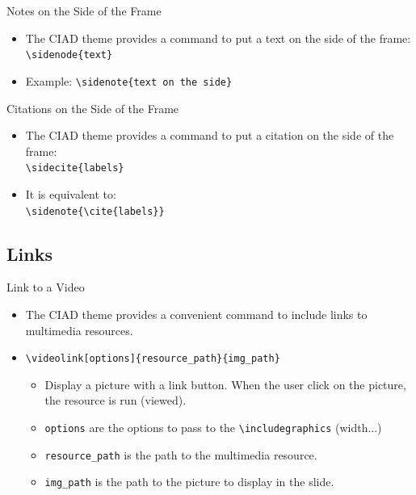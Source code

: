 \documentclass[english,sectioncirclenumberstyle]{ciadbeamer}
\begin{document}
\begin{frame}{Notes on the Side of the Frame}
	\begin{itemize}
	\item The CIAD theme provides a command to put a text on the side of the frame: \\
		\texttt{{\textbackslash}sidenode\{text\}}
	\vspace{1em}
	\item Example: \texttt{{\textbackslash}sidenote\{text on the side\}}
	\end{itemize}
\end{frame}

\begin{frame}{Citations on the Side of the Frame}
	\begin{itemize}
	\item The CIAD theme provides a command to put a citation on the side of the frame: \\
		\texttt{{\textbackslash}sidecite\{labels\}}
	\vspace{1em}
	\item It is equivalent to: \\
		\texttt{{\textbackslash}sidenote\{{\textbackslash}cite\{labels\}\}}
	\end{itemize}
\end{frame}

\subsection{Links}
\subsectiontableofcontentslide

\begin{frame}[t]{Link to a Video}
	\begin{itemize}
	\item The CIAD theme provides a convenient command to include links to multimedia resources.
	\item \texttt{{\textbackslash}videolink[options]\{resource\_path\}\{img\_path\}}
		\begin{itemize}
		\item Display a picture with a link button. When the user click on the picture, the resource is run (viewed).
		\item \texttt{options} are the options to pass to the \texttt{{\textbackslash}includegraphics} (width...)
		\item \texttt{resource\_path} is the path to the multimedia resource.
		\item \texttt{img\_path} is the path to the picture to display in the slide.
		\end{itemize}
	\end{itemize}
	\begin{center}
	\end{center}
\end{frame}
\end{document}
